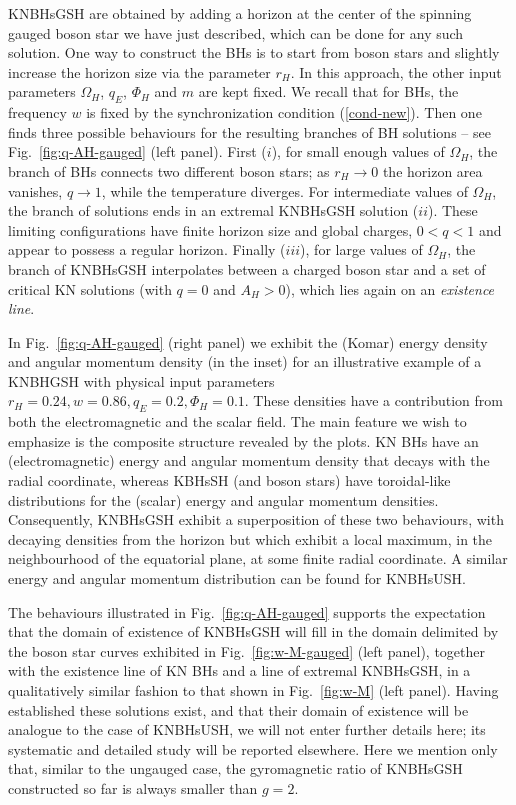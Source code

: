 KNBHsGSH are obtained by adding a horizon at the center of the spinning gauged boson star  
we have just described, which can be done for  any such  solution.
One way to construct the BHs
  is to  start from  boson stars 
and slightly increase the horizon size via the parameter $r_H$.
In this approach, the other input parameters 
$\Omega_H$, $q_E$,  $\Phi_H$ and $m$
are kept fixed. 
We recall that for BHs, the frequency $w$ is fixed by the synchronization condition (\ref{cond-new}).
Then one finds three 
possible behaviours for
the resulting branches of BH solutions -- see Fig.~\ref{fig:q-AH-gauged} (left panel).
 First  ($i$), for small enough values of $\Omega_H$,
 the branch of BHs connects two different boson stars; 
as $r_H\to 0$ the horizon area vanishes, $q\to 1$, while the temperature
 diverges.
For intermediate values of  $\Omega_H$,
the branch of solutions ends in an extremal KNBHsGSH solution ($ii$). 
These limiting configurations have finite
horizon size   and global charges, $0<q<1$ and appear to possess 
a regular horizon.
Finally   ($iii$), for large values of $\Omega_H$,
the branch of  KNBHsGSH interpolates between 
a charged boson star and a set of critical KN solutions (with $q=0$ and $A_H>0$), which lies again 
on an {\it existence line}. 

 In Fig.~\ref{fig:q-AH-gauged} (right panel) we exhibit the (Komar) energy density and angular momentum density (in the inset) for an illustrative example of a KNBHGSH  with physical input parameters 
$r_H=0.24, w =0.86, q_E =0.2, \Phi_H=0.1$. 
These densities have a contribution from both the electromagnetic and the scalar field. The main feature we wish to emphasize is the composite structure revealed by the plots. KN BHs have an (electromagnetic) energy and angular momentum density that decays with the radial coordinate, whereas KBHsSH 
(and boson stars)
have toroidal-like distributions for the (scalar) energy and angular momentum densities. 
Consequently, KNBHsGSH exhibit a superposition of these two behaviours, with decaying densities from the horizon but which exhibit a local maximum, in the neighbourhood of the equatorial plane, at some finite radial coordinate. 
A similar energy and angular momentum distribution can be found for KNBHsUSH.  

The behaviours illustrated in Fig.~\ref{fig:q-AH-gauged} supports the expectation that the domain of existence of KNBHsGSH will fill in the domain delimited by the boson star curves exhibited in Fig.~\ref{fig:w-M-gauged} (left panel), together with the existence line of KN BHs and a line of extremal KNBHsGSH,  in a qualitatively similar fashion to that shown in Fig.~\ref{fig:w-M} (left panel). Having established these solutions exist, and that their domain of existence will be analogue to the case of KNBHsUSH, we will not enter further details here; its systematic and detailed study will be reported elsewhere.
Here we mention only that, similar to the ungauged case, 
the gyromagnetic ratio of  KNBHsGSH constructed so far is always smaller than $g=2$.


